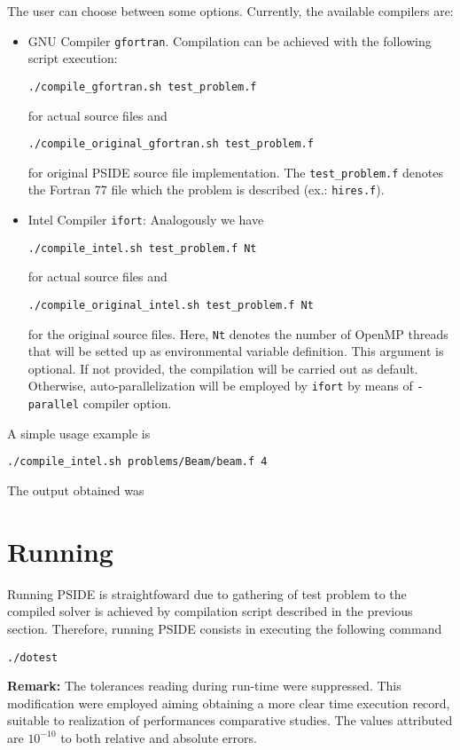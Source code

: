 \documentclass[a4paper,11pt]{article}
\theoremstyle{comm}
\begin{document}
The user can choose between some options. Currently, the available compilers are:
\begin{itemize}
\item GNU Compiler \texttt{gfortran}. Compilation can be achieved with the following script execution:

\begin{Verbatim}[frame=single]
./compile_gfortran.sh test_problem.f
\end{Verbatim}
for actual source files and
\begin{Verbatim}[frame=single]
./compile_original_gfortran.sh test_problem.f
\end{Verbatim}
for original PSIDE source file implementation. The \texttt{test\_problem.f} denotes the Fortran 77 file which the problem is described (ex.: \texttt{hires.f}).

\item Intel Compiler \texttt{ifort}: Analogously we have

\begin{Verbatim}[frame=single]
./compile_intel.sh test_problem.f Nt
\end{Verbatim}
for actual source files and
\begin{Verbatim}[frame=single]
./compile_original_intel.sh test_problem.f Nt
\end{Verbatim}
for the original source files. Here, \texttt{Nt} denotes the number of OpenMP threads that will be setted up as environmental variable definition. This argument is optional. If not provided, the compilation will be carried out as default. Otherwise, auto-parallelization will be employed by \texttt{ifort} by means of \texttt{-parallel} compiler option.

\end{itemize}

A simple usage example is
\begin{Verbatim}[frame=single]
./compile_intel.sh problems/Beam/beam.f 4
\end{Verbatim}

The output obtained was


\section{Running}

Running PSIDE is straightfoward due to gathering of test problem to the compiled solver is achieved by compilation script described in the previous section. Therefore, running PSIDE consists in executing the following command
\begin{Verbatim}[frame=single]
./dotest
\end{Verbatim}

\textbf{Remark:} The tolerances reading during run-time were suppressed. This modification were employed aiming obtaining a more clear time execution record, suitable to realization of performances comparative studies. The values attributed are $10^{-10}$ to both relative and absolute errors.
\end{document}
